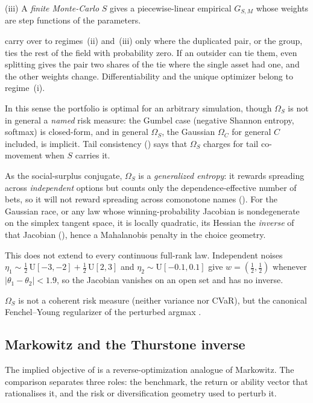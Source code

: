(iii) A \emph{finite Monte-Carlo} $S$ gives a piecewise-linear empirical $G_{S,M}$
whose weights are step functions of the parameters.

 carry over to regimes~(ii) and~(iii) only where
the duplicated pair, or the group, ties the rest of the field with probability
zero. If an outsider can tie them, even splitting gives the pair two shares of
the tie where the single asset had one, and the other weights change.
Differentiability and the unique optimizer belong to regime~(i).

In this sense the portfolio is optimal for an arbitrary simulation, though
$\Omega_S$ is not in general a \emph{named} risk measure: the Gumbel case
(negative Shannon entropy, softmax) is closed-form, and in general $\Omega_S$,
the Gaussian $\Omega_C$ for general $C$ included, is implicit. Tail consistency
() says that $\Omega_S$ charges for tail
co-movement when $S$ carries it.

As the social-surplus conjugate, $\Omega_S$ is a \emph{generalized entropy}: it
rewards spreading across \emph{independent} options but counts only the
dependence-effective number of bets, so it will not reward spreading across
comonotone names ().
For the Gaussian race, or any
law whose winning-probability Jacobian is nondegenerate on the simplex tangent
space, it is locally quadratic, its Hessian the \emph{inverse} of that Jacobian
(), hence a Mahalanobis penalty in the choice geometry.

This
does not extend to every continuous full-rank law.
Independent noises
$\eta_1\sim\tfrac12\,\mathrm{U}[-3,-2]+\tfrac12\,\mathrm{U}[2,3]$ and
$\eta_2\sim\mathrm{U}[-0.1,0.1]$ give $w=(\tfrac12,\tfrac12)$ whenever
$|\theta_1-\theta_2|<1.9$, so the Jacobian vanishes on an open set and has no
inverse.

$\Omega_S$ is not a coherent risk measure (neither variance nor CVaR), but the
canonical Fenchel--Young regularizer of the perturbed argmax
\parencite{berthet2020}.

\subsection{Markowitz and the Thurstone inverse}
\label{sec:markowitz}

The implied objective of  is a reverse-optimization analogue
of Markowitz. The comparison separates three roles: the benchmark, the return or ability vector that
rationalises it, and the risk or diversification geometry used to perturb it.

